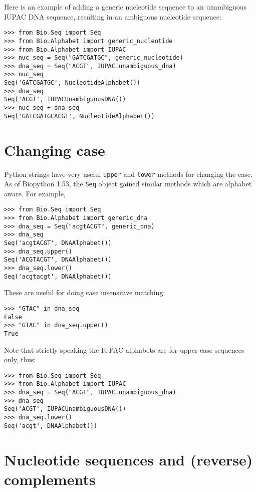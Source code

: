 \documentclass{report}
\begin{document}
Here is an example of adding a generic nucleotide sequence to an unambiguous IUPAC DNA sequence, resulting in an ambiguous nucleotide sequence:

\begin{verbatim}
>>> from Bio.Seq import Seq
>>> from Bio.Alphabet import generic_nucleotide
>>> from Bio.Alphabet import IUPAC
>>> nuc_seq = Seq("GATCGATGC", generic_nucleotide)
>>> dna_seq = Seq("ACGT", IUPAC.unambiguous_dna)
>>> nuc_seq
Seq('GATCGATGC', NucleotideAlphabet())
>>> dna_seq
Seq('ACGT', IUPACUnambiguousDNA())
>>> nuc_seq + dna_seq
Seq('GATCGATGCACGT', NucleotideAlphabet())
\end{verbatim}

\section{Changing case}

Python strings have very useful \verb|upper| and \verb|lower| methods for changing the case.
As of Biopython 1.53, the \verb|Seq| object gained similar methods which are alphabet aware.
For example,

\begin{verbatim}
>>> from Bio.Seq import Seq
>>> from Bio.Alphabet import generic_dna
>>> dna_seq = Seq("acgtACGT", generic_dna)
>>> dna_seq
Seq('acgtACGT', DNAAlphabet())
>>> dna_seq.upper()
Seq('ACGTACGT', DNAAlphabet())
>>> dna_seq.lower()
Seq('acgtacgt', DNAAlphabet())
\end{verbatim}

These are useful for doing case insensitive matching:

\begin{verbatim}
>>> "GTAC" in dna_seq
False
>>> "GTAC" in dna_seq.upper()
True
\end{verbatim}

Note that strictly speaking the IUPAC alphabets are for upper case sequences only, thus:

\begin{verbatim}
>>> from Bio.Seq import Seq
>>> from Bio.Alphabet import IUPAC
>>> dna_seq = Seq("ACGT", IUPAC.unambiguous_dna)
>>> dna_seq
Seq('ACGT', IUPACUnambiguousDNA())
>>> dna_seq.lower()
Seq('acgt', DNAAlphabet())
\end{verbatim}


\section{Nucleotide sequences and (reverse) complements}
\label{sec:seq-reverse-complement}
\end{document}
